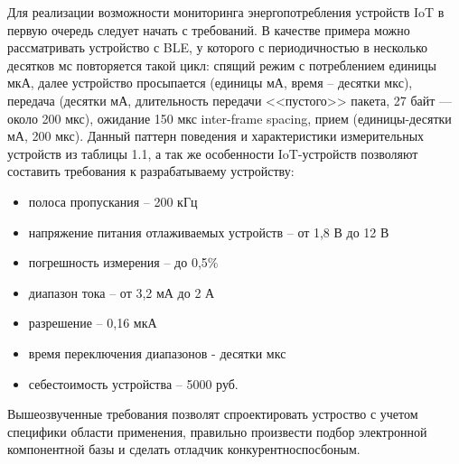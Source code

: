 \begin{input}
Для реализации возможности мониторинга энергопотребления устройств IoT 
в первую очередь следует начать с требований. В качестве примера можно рассматривать устройство с BLE, 
у которого с периодичностью в несколько десятков мс повторяется такой цикл: спящий режим 
с потреблением единицы мкА, далее устройство просыпается (единицы мА, время -- десятки мкс), 
передача (десятки мА, длительность передачи <<пустого>> пакета, 27 байт — около 200 мкс), 
ожидание 150 мкс inter-frame spacing, прием (единицы-десятки мА, 200 мкс). Данный паттерн поведения
и характеристики измерительных устройств из таблицы 1.1, а так же особенности IoT-устройств позволяют составить требования к разрабатываему
устройству:
\begin{itemize}
    \item полоса пропускания -- 200 кГц
    \item напряжение питания отлаживаемых устройств -- от 1,8 В до 12 В
    \item погрешность измерения -- до 0,5\%
    \item диапазон тока -- от 3,2 мА до 2 А
    \item разрешение -- 0,16 мкА
    \item время переключения диапазонов - десятки мкс
    \item себестоимость устройства -- 5000 руб.
\end{itemize}

Вышеозвученные требования позволят спроектировать устроство с учетом специфики области применения,
 правильно произвести подбор
электронной компонентной базы и сделать отладчик конкурентноспосбоным.


\end{input}